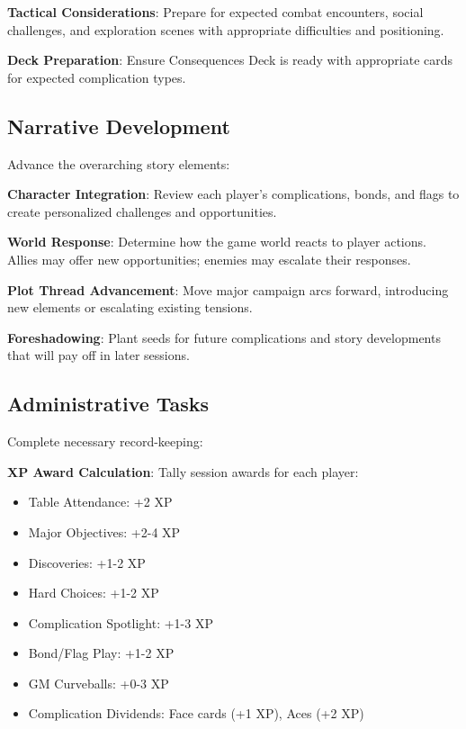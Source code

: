\textbf{Tactical Considerations}: Prepare for expected combat encounters, social challenges, and exploration scenes with appropriate difficulties and positioning.

\textbf{Deck Preparation}: Ensure Consequences Deck is ready with appropriate cards for expected complication types.

\subsection{Narrative Development}

Advance the overarching story elements:

\textbf{Character Integration}: Review each player's complications, bonds, and flags to create personalized challenges and opportunities.

\textbf{World Response}: Determine how the game world reacts to player actions. Allies may offer new opportunities; enemies may escalate their responses.

\textbf{Plot Thread Advancement}: Move major campaign arcs forward, introducing new elements or escalating existing tensions.

\textbf{Foreshadowing}: Plant seeds for future complications and story developments that will pay off in later sessions.

\subsection{Administrative Tasks}

Complete necessary record-keeping:

\textbf{XP Award Calculation}: Tally session awards for each player:
\begin{itemize}
    \item Table Attendance: +2 XP
    \item Major Objectives: +2-4 XP
    \item Discoveries: +1-2 XP
    \item Hard Choices: +1-2 XP
    \item Complication Spotlight: +1-3 XP
    \item Bond/Flag Play: +1-2 XP
    \item GM Curveballs: +0-3 XP
    \item Complication Dividends: Face cards (+1 XP), Aces (+2 XP)
\end{itemize}


